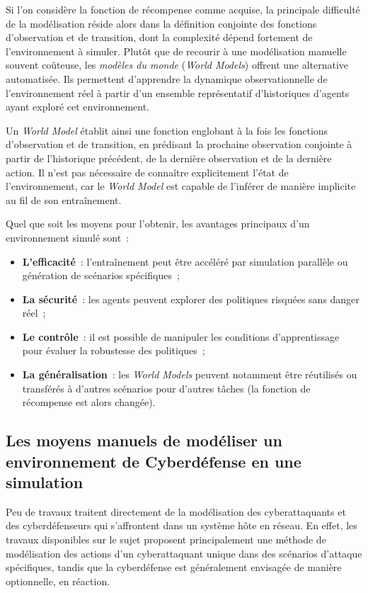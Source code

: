 Si l’on considère la fonction de récompense comme acquise, la principale difficulté de la modélisation réside alors dans la définition conjointe des fonctions d’observation et de transition, dont la complexité dépend fortement de l’environnement à simuler. Plutôt que de recourir à une modélisation manuelle souvent coûteuse, les \textit{modèles du monde} (\textit{World Models}) offrent une alternative automatisée. Ils permettent d’apprendre la dynamique observationnelle de l’environnement réel à partir d’un ensemble représentatif d’historiques d’agents ayant exploré cet environnement.

Un \textit{World Model} établit ainsi une fonction englobant à la fois les fonctions d’observation et de transition, en prédisant la prochaine observation conjointe à partir de l’historique précédent, de la dernière observation et de la dernière action. Il n’est pas nécessaire de connaître explicitement l’état de l’environnement, car le \textit{World Model} est capable de l’inférer de manière implicite au fil de son entraînement.

Quel que soit les moyens pour l'obtenir, les avantages principaux d'un environnement simulé sont~:
\begin{itemize}
  \item \textbf{L'efficacité}~: l'entraînement peut être accéléré par simulation parallèle ou génération de scénarios spécifiques~;
  \item \textbf{La sécurité}~: les agents peuvent explorer des politiques risquées sans danger réel~;
  \item \textbf{Le contrôle}~: il est possible de manipuler les conditions d'apprentissage pour évaluer la robustesse des politiques~;
  \item \textbf{La généralisation}~: les \textit{World Models} peuvent notamment être réutilisés ou transférés à d'autres scénarios pour d'autres tâches (la fonction de récompense est alors changée).
\end{itemize}


\subsection{Les moyens manuels de modéliser un environnement de Cyberdéfense en une simulation}

\noindent

Peu de travaux traitent directement de la modélisation des cyberattaquants et des cyberdéfenseurs qui s'affrontent dans un système hôte en réseau. En effet, les travaux disponibles sur le sujet proposent principalement une méthode de modélisation des actions d'un cyberattaquant unique dans des scénarios d'attaque spécifiques, tandis que la cyberdéfense est généralement envisagée de manière optionnelle, en réaction.

